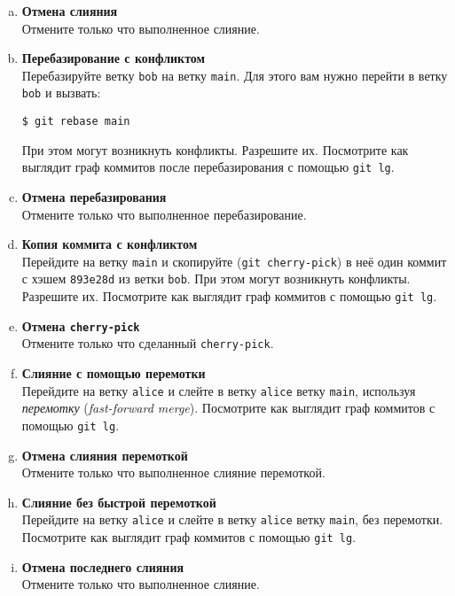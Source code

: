 \documentclass{article}
\begin{document}
\begin{enumerate}[a.]
\item \textbf{Отмена слияния}\\
Отмените только что выполненное слияние.

\item \textbf{Перебазирование с конфликтом}\\
Перебазируйте ветку \texttt{bob} на ветку \texttt{main}. Для этого вам нужно перейти в ветку \texttt{bob} и вызвать:
\begin{lstlisting}
$ git rebase main
\end{lstlisting}
При этом могут возникнуть конфликты. Разрешите их. Посмотрите как выглядит граф коммитов после перебазирования с помощью \texttt{git lg}.

\item \textbf{Отмена перебазирования}\\
Отмените только что выполненное перебазирование.

\item \textbf{Копия коммита с конфликтом}\\
Перейдите на ветку \texttt{main} и скопируйте (\texttt{git cherry-pick}) в неё один коммит с хэшем \texttt{893e28d} из ветки \texttt{bob}. При этом могут возникнуть конфликты. Разрешите их. Посмотрите как выглядит граф коммитов с помощью \texttt{git lg}.

\item \textbf{Отмена \texttt{cherry-pick}}\\
Отмените только что сделанный \texttt{cherry-pick}.

\item \textbf{Слияние с помощью перемотки}\\
Перейдите на ветку \texttt{alice} и слейте в ветку \texttt{alice} ветку \texttt{main}, используя \textit{перемотку} (\textit{fast-forward merge}). Посмотрите как выглядит граф коммитов с помощью \texttt{git lg}.

\item \textbf{Отмена слияния перемоткой}\\
Отмените только что выполненное слияние перемоткой.

\item \textbf{Слияние без быстрой перемоткой}\\
Перейдите на ветку \texttt{alice} и слейте в ветку \texttt{alice} ветку \texttt{main}, без перемотки. Посмотрите как выглядит граф коммитов с помощью \texttt{git lg}.

\item \textbf{Отмена последнего слияния}\\
Отмените только что выполненное слияние.


\end{enumerate}
\end{document}
